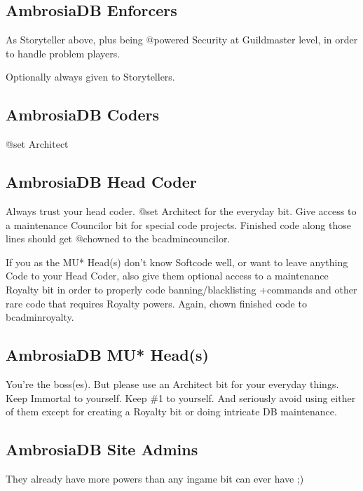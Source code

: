 \documentclass[letterpaper,10pt,english]{sphinxmanual}
\begin{document}
\subsection{AmbrosiaDB Enforcers}
\label{\detokenize{ambrosiadb:ambrosiadb-enforcers}}
\sphinxAtStartPar
As Storyteller above, plus being @powered Security at
Guildmaster level, in order to handle problem players.

\sphinxAtStartPar
Optionally always given to Storytellers.


\subsection{AmbrosiaDB Coders}
\label{\detokenize{ambrosiadb:ambrosiadb-coders}}
\sphinxAtStartPar
@set Architect


\subsection{AmbrosiaDB Head Coder}
\label{\detokenize{ambrosiadb:ambrosiadb-head-coder}}
\sphinxAtStartPar
Always trust your head coder.
@set Architect for the everyday bit. Give access to a
maintenance Councilor bit for special code projects. Finished
code along those lines should get @chowned to the
bc\sphinxhyphen{}admin\sphinxhyphen{}councilor.

\sphinxAtStartPar
If you as the MU* Head(s) don’t know Softcode well, or want to
leave anything Code to your Head Coder, also give them optional
access to a maintenance Royalty bit in order to properly code
banning/blacklisting +commands and other rare code that requires
Royalty powers. Again, chown finished code to bc\sphinxhyphen{}admin\sphinxhyphen{}royalty.


\subsection{AmbrosiaDB MU* Head(s)}
\label{\detokenize{ambrosiadb:ambrosiadb-mu-head-s}}
\sphinxAtStartPar
You’re the boss(es). But please use an Architect bit for your
everyday things. Keep Immortal to yourself. Keep \#1 to yourself.
And seriously avoid using either of them except for creating
a Royalty bit or doing intricate DB maintenance.


\subsection{AmbrosiaDB Site Admins}
\label{\detokenize{ambrosiadb:ambrosiadb-site-admins}}
\sphinxAtStartPar
They already have more powers than any in\sphinxhyphen{}game bit can ever
have ;)
\end{document}
